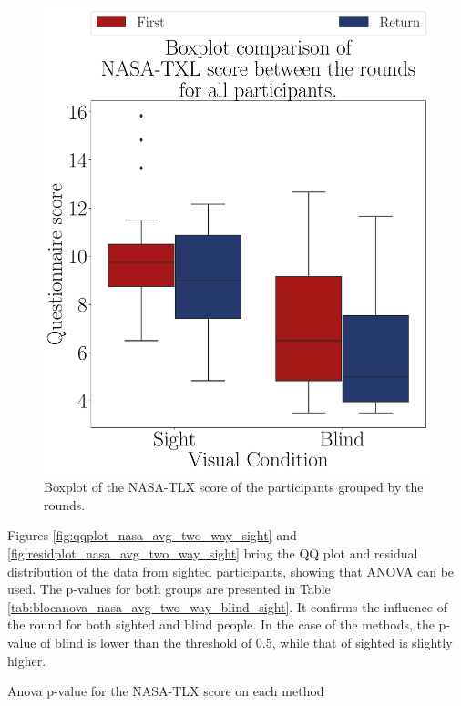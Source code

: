 \begin{figure}[!htb]
\begin{minipage}{0.45\textwidth}
        \centering
        \includegraphics[width = \textwidth]{Resultados/Nasa/Figuras/pdf/boxplot_noBase_nasa_4_rounds.pdf}
        \caption{Boxplot of the NASA-TLX score of the participants grouped by the rounds.}
        \label{fig:boxplot_noBase_nasa_4_rounds}
    \end{minipage}
\end{figure}

Figures \ref{fig:qqplot_nasa_avg_two_way_sight} and \ref{fig:residplot_nasa_avg_two_way_sight} bring the QQ plot and residual distribution of the data from sighted participants, showing that ANOVA can be used. The p-values for both groups are presented in Table \ref{tab:blocanova_nasa_avg_two_way_blind_sight}. It confirms the influence of the round for both sighted and blind people. In the case of the methods, the p-value of blind is lower than the threshold of 0.5, while that of sighted is slightly higher.

\begin{table}[!thb]
    \caption{Anova p-value for the NASA-TLX score on each method}
    \label{tab:blocanova_nasa_avg_two_way_blind_sight}
    \begin{minipage}{0.45\textwidth}
        
    \end{minipage}
    \begin{minipage}{0.45\textwidth}
            
    \end{minipage}
\end{table}


